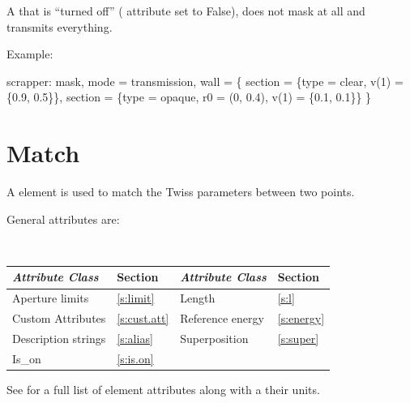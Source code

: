 {A  that is ``turned off'' ( attribute set to False), does not mask at all and
transmits everything.

Example:
\begin{example}
scrapper: mask, mode = transmission, wall = \{
    section = \{type = clear, v(1) = \{0.9, 0.5\}\},
    section = \{type = opaque, r0 = (0, 0.4), v(1) = \{0.1, 0.1\}\}
  \}
\end{example}

\newpage

\section{Match}
\label{s:match}

A  element is used to match the Twiss parameters between two
points. 

General  attributes are:
\begin{center} 
\tt
\begin{tabular}{llll} \toprule
  {\sl Attribute Class}      & Section           & {\sl Attribute Class}      & Section         \\ \midrule
  Aperture limits            & \ref{s:limit}     & Length                     & \ref{s:l}       \\
  Custom Attributes          & \ref{s:cust.att}  & Reference energy           & \ref{s:energy}  \\ 
  Description strings        & \ref{s:alias}     & Superposition              & \ref{s:super}   \\ 
  Is_on                      & \ref{s:is.on}     &                            &                 \\
  \bottomrule
\end{tabular}
\end{center}
\toffset
See  for a full list of element attributes along with a their units.

}
